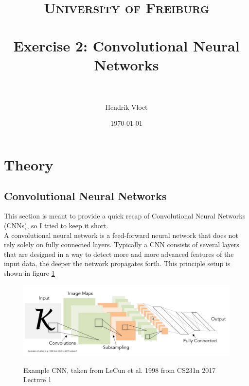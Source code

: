 \documentclass[paper=a4, fontsize=11pt]{scrartcl} %
\title{	
\normalfont \normalsize 
\textsc{University of Freiburg} \\ [25pt] %
\horrule{0.5pt} \\[0.4cm] %
\huge Exercise 2: Convolutional Neural Networks \\ %
\horrule{2pt} \\[0.5cm] %
}
\author{Hendrik Vloet} %
\date{\normalsize\today} %
\numberwithin{equation}{section} %
\numberwithin{figure}{section} %
\numberwithin{table}{section} %
\begin{document}
\maketitle %


\section{Theory}
\subsection{Convolutional Neural Networks}

This section is meant to provide a quick recap of Convolutional Neural Networks (CNNs), so I tried to keep it short.\\
A convolutional neural network is a feed-forward neural network that does not rely solely on fully connected layers. Typically a CNN consists of several layers that are designed in a way to detect more and more advanced features of the input data, the deeper the network propagates forth. This principle setup is shown in figure \ref{pic:example_cnn}
\begin{figure}[hbpt!]
	\includegraphics[width=\textwidth]{example_cnn}
	\label{pic:example_cnn}
	\caption{Example CNN, taken from LeCun et al. 1998 from CS231n 2017 Lecture 1}
\end{figure}
\clearpage
\end{document}
